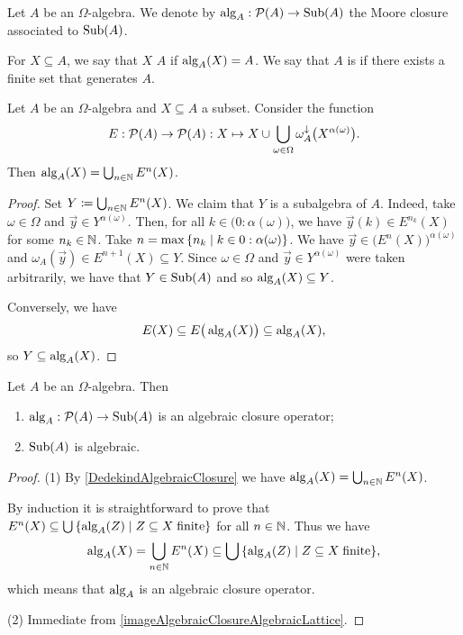 \begin{definition}
Let $A$ be an $\Omega$-algebra. We denote by $\operatorname{alg}_A: \operatorname{\mathcal{P}}(A)\to \operatorname{Sub}(A)$ the Moore closure associated to $\operatorname{Sub}(A)$.

For $X\subseteq A$, we say that $X$  $A$ if $\operatorname{alg}_A(X) = A$. We say that $A$ is  if there exists a finite set that generates $A$.
\end{definition}

\begin{lemma} \label{DedekindAlgebraicClosure}
Let $A$ be an $\Omega$-algebra and $X\subseteq A$ a subset. Consider the function
\[ E:\operatorname{\mathcal{P}}(A)\to \operatorname{\mathcal{P}}(A): X\mapsto X\cup \bigcup_{\omega\in \Omega}\omega_A^\downarrow\big(X^{\alpha(\omega)}\big). \]
Then $\operatorname{alg}_A(X) = \bigcup_{n\in\mathbb{N}}E^n(X)$.
\end{lemma}
\begin{proof}
Set $Y \coloneqq \bigcup_{n\in\mathbb{N}}E^n(X)$. We claim that $Y$ is a subalgebra of $A$. Indeed, take $\omega\in \Omega$ and $\vec{y} \in Y^{\alpha(\omega)}$. Then, for all $k\in \big(0:\alpha(\omega)\big)$, we have $\vec{y}(k)\in E^{n_k}(X)$ for some $n_k\in \mathbb{N}$. Take $n = \max\setbuilder{n_k}{k\in 0:\alpha(\omega)}$. We have $\vec{y}\in \big(E^n(X)\big)^{\alpha(\omega)}$ and $\omega_A(\vec{y}) \in E^{n+1}(X) \subseteq Y$. Since $\omega\in \Omega$ and $\vec{y} \in Y^{\alpha(\omega)}$ were taken arbitrarily, we have that $Y\in\operatorname{Sub}(A)$ and so $\operatorname{alg}_A(X)\subseteq Y$.

Conversely, we have
\[ E(X) \subseteq E\big(\operatorname{alg}_A(X)\big) \subseteq \operatorname{alg}_A(X), \]
so $Y\subseteq \operatorname{alg}_A(X)$.
\end{proof}

\begin{proposition}
Let $A$ be an $\Omega$-algebra. Then
\begin{enumerate}
\item $\operatorname{alg}_A: \operatorname{\mathcal{P}}(A)\to \operatorname{Sub}(A)$ is an algebraic closure operator;
\item $\operatorname{Sub}(A)$ is algebraic.
\end{enumerate}
\end{proposition}
\begin{proof}
(1) By \ref{DedekindAlgebraicClosure} we have $\operatorname{alg}_A(X) = \bigcup_{n\in\mathbb{N}}E^n(X)$.

By induction it is straightforward to prove that $E^n(X) \subseteq \bigcup \setbuilder{\alg_A(Z)}{Z\subseteq X\; \text{finite}}$ for all $n\in \mathbb{N}$. Thus we have
\[ \alg_A(X) = \bigcup_{n\in\N}E^n(X) \subseteq \bigcup \setbuilder{\alg_A(Z)}{Z\subseteq X\; \text{finite}}, \]
which means that $\operatorname{alg}_A$ is an algebraic closure operator.

(2) Immediate from \ref{imageAlgebraicClosureAlgebraicLattice}.
\end{proof}

